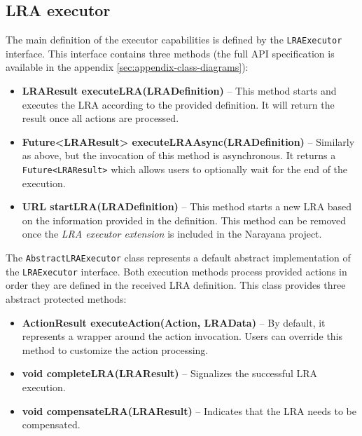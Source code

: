 \documentclass[oneside,
  digital, %
  table,   %
  lof,     %
  lot,     %
]{fithesis3}
\begin{document}
\subsection{LRA executor}

The main definition of the executor capabilities is defined by the \texttt{LRAExecutor} interface. This interface contains three methods (the full API specification is available in the appendix \ref{sec:appendix-class-diagrams}):

\begin{itemize}
    \item \textbf{LRAResult executeLRA(LRADefinition)} -- This method starts and executes the LRA according to the provided definition. It will return the result once all actions are processed.
    
    \item \textbf{Future<LRAResult> executeLRAAsync(LRADefinition)} -- Similarly as above, but the invocation of this method is asynchronous. It returns a \texttt{Future<LRAResult>} which allows users to optionally wait for the end of the execution.
    
    \item \textbf{URL startLRA(LRADefinition)} -- This method starts a new LRA based on the information provided in the definition. This method can be removed once the \textit{LRA executor extension} is included in the Narayana project.
\end{itemize}

The \texttt{AbstractLRAExecutor} class represents a default abstract implementation of the \texttt{LRAExecutor} interface. Both execution methods process provided actions in order they are defined in the received LRA definition. This class provides three abstract protected methods:

\begin{itemize}
    \item \textbf{ActionResult executeAction(Action, LRAData)} -- By default, it represents a wrapper around the action invocation. Users can override this method to customize the action processing.
    
    \item \textbf{void completeLRA(LRAResult)} -- Signalizes the successful LRA execution.
    
    \item \textbf{void compensateLRA(LRAResult)} -- Indicates that the LRA needs to be compensated.
\end{itemize}
\end{document}

